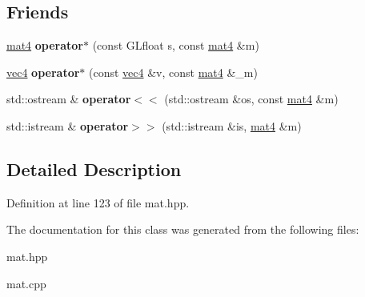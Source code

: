 \subsection*{\-Friends}
\begin{DoxyCompactItemize}
\item 
\hypertarget{class_angel_1_1mat4_aee74ba4512e3c59e8ed73764e4396d59}{\hyperlink{class_angel_1_1mat4}{mat4} {\bfseries operator$\ast$} (const \-G\-Lfloat s, const \hyperlink{class_angel_1_1mat4}{mat4} \&m)}\label{class_angel_1_1mat4_aee74ba4512e3c59e8ed73764e4396d59}

\item 
\hypertarget{class_angel_1_1mat4_a43eac2e676368c54279c3babf511fa6b}{\hyperlink{struct_angel_1_1vec4}{vec4} {\bfseries operator$\ast$} (const \hyperlink{struct_angel_1_1vec4}{vec4} \&v, const \hyperlink{class_angel_1_1mat4}{mat4} \&\-\_\-m)}\label{class_angel_1_1mat4_a43eac2e676368c54279c3babf511fa6b}

\item 
\hypertarget{class_angel_1_1mat4_ac079e857a3c74a1b974e4f4619e16adf}{std\-::ostream \& {\bfseries operator$<$$<$} (std\-::ostream \&os, const \hyperlink{class_angel_1_1mat4}{mat4} \&m)}\label{class_angel_1_1mat4_ac079e857a3c74a1b974e4f4619e16adf}

\item 
\hypertarget{class_angel_1_1mat4_a897b946d3a30dbddc811d486bfa4b61a}{std\-::istream \& {\bfseries operator$>$$>$} (std\-::istream \&is, \hyperlink{class_angel_1_1mat4}{mat4} \&m)}\label{class_angel_1_1mat4_a897b946d3a30dbddc811d486bfa4b61a}

\end{DoxyCompactItemize}


\subsection{\-Detailed \-Description}


\-Definition at line 123 of file mat.\-hpp.



\-The documentation for this class was generated from the following files\-:\begin{DoxyCompactItemize}
\item 
mat.\-hpp\item 
mat.\-cpp\end{DoxyCompactItemize}
